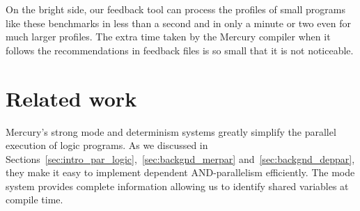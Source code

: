On the bright side,
our feedback tool can process the profiles of small programs like these
benchmarks in less than a second 
and in only a minute or two even for much larger profiles.
The extra time taken by the Mercury compiler
when it follows the recommendations in feedback files
is so small that it is not noticeable.


\section{Related work}
\label{sec:overlap_related}



Mercury's strong mode and determinism systems
greatly simplify the parallel execution of logic programs.
As we discussed in
Sections~\ref{sec:intro_par_logic},~\ref{sec:backgnd_merpar} and~\ref{sec:backgnd_deppar},
they make it easy to implement dependent AND-parallelism efficiently.
The mode system provides complete information allowing us to identify
shared variables at compile time.


